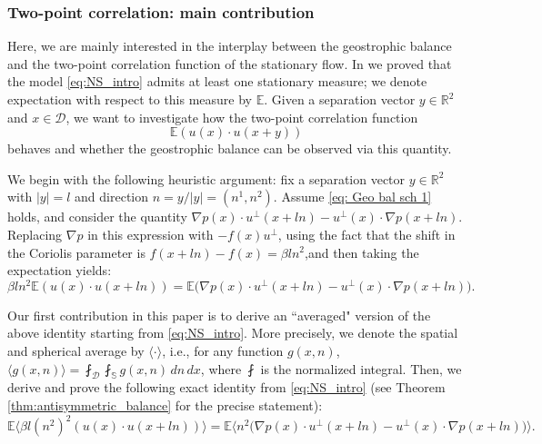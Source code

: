 \documentclass[11pt,a4paper]{article}
\numberwithin{equation}{section}
\numberwithin{theorem}{section}
\numberwithin{remark}{section}
\numberwithin{definition}{section}
\begin{document}
\subsubsection{Two-point correlation: main contribution}

Here, we are mainly interested in the interplay between the geostrophic balance and the two-point correlation function of the stationary flow. In \cite{YuriAmiraliGigliola} we proved that the model \eqref{eq:NS_intro} admits at least one stationary measure; we denote expectation with respect to this measure by $\mathbb{E}$. Given a separation vector $y \in \mathbb{R}^2$ and $x \in \mathcal{D}$, we want to investigate how the two-point correlation function 
\begin{equation}
    \mathbb{E}(u(x) \cdot u(x+y))
\end{equation}
behaves and whether the geostrophic balance can be observed via this quantity.

We begin with the following heuristic argument: fix a separation vector $y\in \mathbb{R}^2$ with $|y|=l$ and direction $n=y/|y|=(n^1,n^2)$. Assume \eqref{eq: Geo bal sch 1} holds, and consider the quantity $\nabla p(x) \cdot u^{\perp}(x+ln) - u^{\perp}(x) \cdot \nabla p(x+ ln)$. Replacing $\nabla p$ in this expression with $-f(x) u^{\perp}$, using the fact that the shift in the Coriolis parameter is $f(x+ln)-f(x)=\beta l n^2$,and then taking the expectation yields: 
\begin{equation} \label{eq: two point function intro heur}
    \beta l n^2\mathbb{E}(u(x) \cdot u(x+ln)) = \mathbb{E}\big(\nabla p(x) \cdot u^{\perp}(x+ln) - u^{\perp}(x) \cdot \nabla p(x+ ln)\big).
\end{equation}

Our first contribution in this paper is to derive an ``averaged" version of the above identity starting from \eqref{eq:NS_intro}.  
More precisely, we denote the spatial and spherical average by $\langle \cdot \rangle$, i.e., for any function $g(x,n)$, $\langle g(x,n) \rangle = \fint_{\mathcal{D}} \fint_{\mathbb{S}} g(x,n) \, dn \, dx$, where $\fint$ is the normalized integral. Then, we derive and prove the following exact identity from \eqref{eq:NS_intro} (see Theorem \ref{thm:antisymmetric_balance} for the precise statement): 
\begin{equation} \label{eq: balance sch 2}
      \mathbb{E} \langle \beta l (n^2)^2 (u(x) \cdot u(x+ln)) \rangle =  \mathbb{E}\langle n^2 \big(\nabla p(x) \cdot u^{\perp}(x+ln) - u^{\perp}(x) \cdot \nabla p(x+ln) \big)\rangle.
\end{equation}
\end{document}
